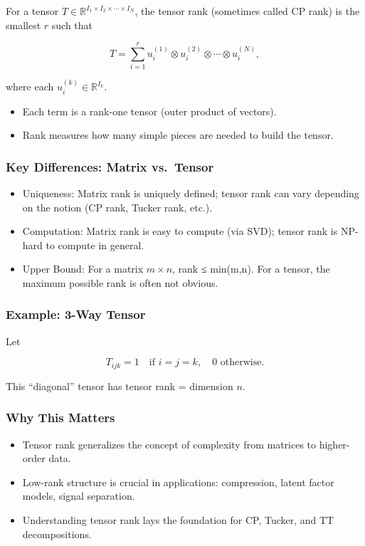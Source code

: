 \documentclass[
  letterpaper,
  DIV=11,
  numbers=noendperiod]{scrreprt}
\providecommand{\tightlist}{%
  \setlength{\itemsep}{0pt}\setlength{\parskip}{0pt}}
\begin{document}
For a tensor
\(T \in \mathbb{R}^{I_1 \times I_2 \times \cdots \times I_N}\), the
tensor rank (sometimes called CP rank) is the smallest \(r\) such that

\[
T = \sum_{i=1}^r u^{(1)}_i \otimes u^{(2)}_i \otimes \cdots \otimes u^{(N)}_i,
\]

where each \(u^{(k)}_i \in \mathbb{R}^{I_k}\).

\begin{itemize}
\tightlist
\item
  Each term is a rank-one tensor (outer product of vectors).
\item
  Rank measures how many simple pieces are needed to build the tensor.
\end{itemize}

\subsubsection{Key Differences: Matrix
vs.~Tensor}\label{key-differences-matrix-vs.-tensor}

\begin{itemize}
\tightlist
\item
  Uniqueness: Matrix rank is uniquely defined; tensor rank can vary
  depending on the notion (CP rank, Tucker rank, etc.).
\item
  Computation: Matrix rank is easy to compute (via SVD); tensor rank is
  NP-hard to compute in general.
\item
  Upper Bound: For a matrix \(m \times n\), rank ≤ min(m,n). For a
  tensor, the maximum possible rank is often not obvious.
\end{itemize}

\subsubsection{Example: 3-Way Tensor}\label{example-3-way-tensor}

Let

\[
T_{ijk} = 1 \quad \text{if } i=j=k, \quad 0 \text{ otherwise}.
\]

This ``diagonal'' tensor has tensor rank = dimension \(n\).

\subsubsection{Why This Matters}\label{why-this-matters-33}

\begin{itemize}
\tightlist
\item
  Tensor rank generalizes the concept of complexity from matrices to
  higher-order data.
\item
  Low-rank structure is crucial in applications: compression, latent
  factor models, signal separation.
\item
  Understanding tensor rank lays the foundation for CP, Tucker, and TT
  decompositions.
\end{itemize}
\end{document}
